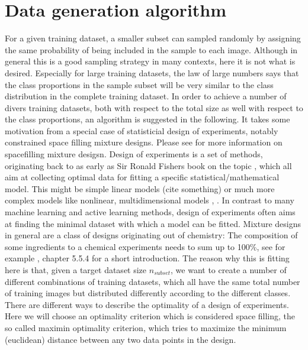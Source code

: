 \documentclass{article} %
\begin{document}
\section{Data generation algorithm}




For a given training dataset, a smaller subset can sampled randomly by assigning the same probability of being included in the sample to each image.
Although in general this is a good sampling strategy in many contexts, here it is not what is desired.
Especially for large training datasets, the law of large numbers says that the class proportions in the sample subset will be very similar to the class distribution in the complete training dataset.
In order to achieve a number of divers training datasets, both with respect to the total size as well with respect to the class proportions, an algorithm is suggested in the following.
It takes some motivation from a special case of statisticial design of experiments, notably constrained space filling mixture designs. Please see \cite{gomes_hal_spacefilling_mixtures} for more information on spacefilling mixture desigsn.
Design of experiments is a set of methods, originating back to as early as Sir Ronald Fishers book on the topic \cite{fisher_1935}, which all aim at collecting optimal data for fitting a specific statistical/mathematical model. This might be simple linear models (cite something) or much more complex
models like nonlinear, multidimensional models \cite{myers2009response}, \cite{Goos_Jones_optDoE_2011}. In contrast to many machine learning and active learning methods, design of experiments
often aims at finding the minimal dataset with which a model can be fitted.
Mixture designs in general are a class of designs originating out of chemistry: The composition of some ingredients to a chemical experiments needs to sum up to 100\%, see for example \cite{Nist_2012_eng_stats}, chapter 5.5.4 for a short introduction.
The reason why this is fitting here is that, given a target dataset size $n_{subset}$, we want to create a number of different combinations of training datasets, which all have the same total number of training images but distributed differently according to the different classes.
There are different ways to describe the optimality of a design of experiments. Here we will choose an optimality criterion which is considered space filling, the so called maximin optimality criterion, which tries to maximize the minimum (euclidean) distance between any two data points in the design.
\end{document}
